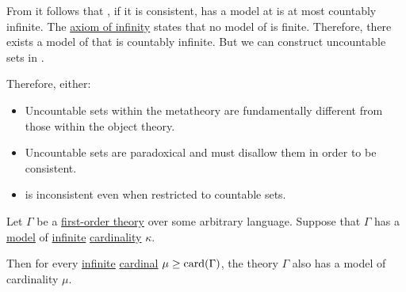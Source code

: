 \begin{example}\label{ex:skolems_paradox}
  From  it follows that \hyperref[def:zfc]{}, if it is consistent, has a model at is at most countably infinite. The \hyperref[def:zfc/infinity]{axiom of infinity} states that no model of  is finite. Therefore, there exists a model of  that is countably infinite. But we can construct uncountable sets in .

  Therefore, either:
  \begin{itemize}
    \item Uncountable sets within the metatheory are fundamentally different from those within the object theory.
    \item Uncountable sets are paradoxical and  must disallow them in order to be consistent.
    \item {} is inconsistent even when restricted to countable sets.
  \end{itemize}
\end{example}

\begin{theorem}\label{thm:upward_lowenheim_skolem_theorem}
  Let \( \Gamma \) be a \hyperref[def:first_order_theory]{first-order theory} over some arbitrary language. Suppose that \( \Gamma \) has a \hyperref[def:first_order_semantics/satisfiability]{model} of \hyperref[def:set_finiteness]{infinite} \hyperref[thm:cardinality_existence]{cardinality} \( \kappa \).

  Then for every \hyperref[def:set_finiteness]{infinite} \hyperref[def:cardinal]{cardinal} \( \mu \geq \operatorname{card}(\Gamma) \), the theory \( \Gamma \) also has a model of cardinality \( \mu \).
\end{theorem}

